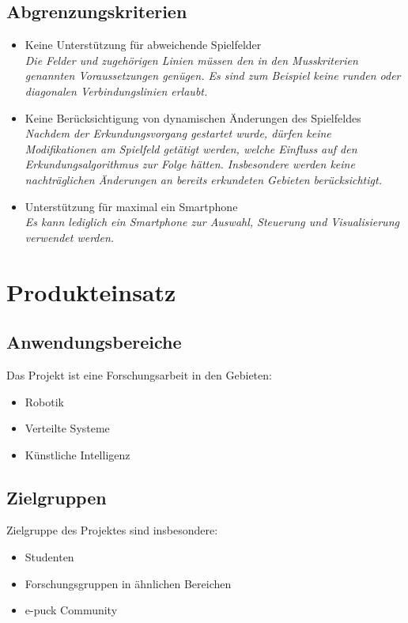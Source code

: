 \documentclass[10pt,a4paper]{article}
\let\oldsection\section
\renewcommand{\section}{\newpage \oldsection}
\begin{document}
		\subsection{Abgrenzungskriterien}
			\begin{itemize}
				\item Keine Unterstützung für abweichende Spielfelder
					\\ \textsl{Die Felder und zugehörigen Linien müssen den in den Musskriterien genannten Voraussetzungen
						genügen. Es sind zum Beispiel keine runden oder diagonalen Verbindungslinien erlaubt.}
				\item Keine Berücksichtigung von dynamischen Änderungen des Spielfeldes
					\\ \textsl{Nachdem der Erkundungsvorgang gestartet wurde, dürfen keine Modifikationen am
						Spielfeld getätigt werden, welche Einfluss auf den Erkundungsalgorithmus zur Folge hätten.
						Insbesondere werden keine nachträglichen Änderungen an bereits erkundeten Gebieten berücksichtigt.}			
				\item Unterstützung für maximal ein Smartphone
					\\ \textsl{Es kann lediglich ein Smartphone zur Auswahl, Steuerung und Visualisierung verwendet
						werden.}		
			\end{itemize}
	\section{Produkteinsatz}
		\subsection{Anwendungsbereiche}
			Das Projekt ist eine Forschungsarbeit in den Gebieten:
			\begin{itemize}
				\item Robotik
				\item Verteilte Systeme
				\item Künstliche Intelligenz
			\end{itemize}
		\subsection{Zielgruppen}
			Zielgruppe des Projektes sind insbesondere: 
			\begin{itemize}
				\item Studenten
				\item Forschungsgruppen in ähnlichen Bereichen
				\item e-puck Community
			\end{itemize}
\end{document}
